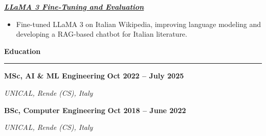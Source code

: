 \documentclass[9pt, a4paper]{article}
\newcommand{\cvsection}[1]{%
	\vspace{2pt}\par
	{\Large\bfseries\color{sectionblue}#1}\par
	\vspace{2pt}\hrule\vspace{6pt}
}
\newcommand{\cvsubsection}[3]{%
	\par {\large\bfseries #1} \hfill {\bfseries #2} \par {\textit{#3}} \vspace{4pt}
}
\newcommand{\cvproject}[1]{%
	\par {{\bfseries{\textit{#1}}}} \par \vspace{4pt}
}
\begin{document}
\begin{minipage}[t]{0.65\linewidth}
		\vspace{5pt}
		\cvproject{\href{https://github.com/bGuzzo/Italian-LLaMA-Project}{LLaMA 3 Fine-Tuning and Evaluation}}
		\begin{itemize}[leftmargin=*, nosep]
			\item \footnotesize Fine-tuned LLaMA 3 on Italian Wikipedia, improving language modeling and developing a RAG-based chatbot for Italian literature.
		\end{itemize}
		
		\vspace{10pt}\par
		\cvsection{Education}
		
		\cvsubsection{MSc, AI \& ML Engineering}{Oct 2022 -- July 2025}{UNICAL, Rende (CS), Italy}
		\cvsubsection{BSc, Computer Engineering}{Oct 2018 -- June 2022}{UNICAL, Rende (CS), Italy}
		
	\end{minipage}%
	\hfill%
\end{document}
